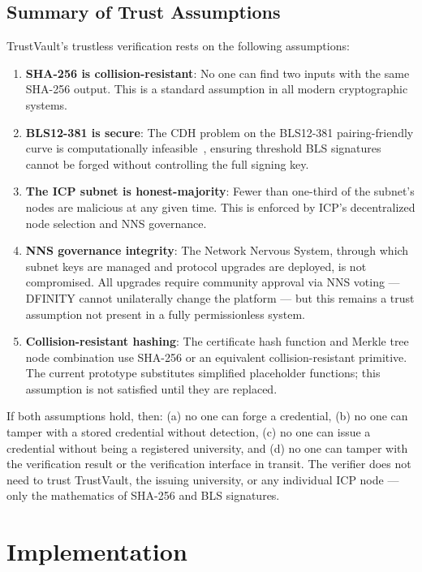 \documentclass[journal]{IEEEtran}
\begin{document}
\subsection{Summary of Trust Assumptions}

TrustVault's trustless verification rests on the following assumptions:
\begin{enumerate}
  \item \textbf{SHA-256 is collision-resistant}: No one can find two inputs with the same SHA-256 output. This is a standard assumption in all modern cryptographic systems.
  \item \textbf{BLS12-381 is secure}: The CDH problem on the BLS12-381 pairing-friendly curve is computationally infeasible~\cite{boneh2001bls}, ensuring threshold BLS signatures cannot be forged without controlling the full signing key.
  \item \textbf{The ICP subnet is honest-majority}: Fewer than one-third of the subnet's nodes are malicious at any given time. This is enforced by ICP's decentralized node selection and NNS governance.
  \item \textbf{NNS governance integrity}: The Network Nervous System, through which subnet keys are managed and protocol upgrades are deployed, is not compromised. All upgrades require community approval via NNS voting — DFINITY cannot unilaterally change the platform — but this remains a trust assumption not present in a fully permissionless system.
  \item \textbf{Collision-resistant hashing}: The certificate hash function and Merkle tree node combination use SHA-256 or an equivalent collision-resistant primitive. The current prototype substitutes simplified placeholder functions; this assumption is not satisfied until they are replaced.
\end{enumerate}

If both assumptions hold, then: (a) no one can forge a credential, (b) no one can tamper with a stored credential without detection, (c) no one can issue a credential without being a registered university, and (d) no one can tamper with the verification result or the verification interface in transit. The verifier does not need to trust TrustVault, the issuing university, or any individual ICP node — only the mathematics of SHA-256 and BLS signatures.

\section{Implementation}
\label{sec:impl}
\end{document}
